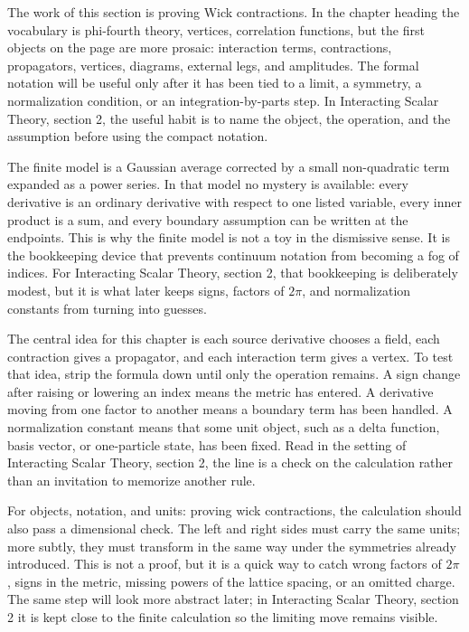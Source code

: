 The work of this section is proving Wick contractions.  In the chapter heading the vocabulary is phi-fourth theory, vertices, correlation functions, but the first objects on the page are more prosaic: interaction terms, contractions, propagators, vertices, diagrams, external legs, and amplitudes.  The formal notation will be useful only after it has been tied to a limit, a symmetry, a normalization condition, or an integration-by-parts step.  In Interacting Scalar Theory, section 2, the useful habit is to name the object, the operation, and the assumption before using the compact notation.

The finite model is a Gaussian average corrected by a small non-quadratic term expanded as a power series.  In that model no mystery is available: every derivative is an ordinary derivative with respect to one listed variable, every inner product is a sum, and every boundary assumption can be written at the endpoints.  This is why the finite model is not a toy in the dismissive sense.  It is the bookkeeping device that prevents continuum notation from becoming a fog of indices.  For Interacting Scalar Theory, section 2, that bookkeeping is deliberately modest, but it is what later keeps signs, factors of \(2\pi\), and normalization constants from turning into guesses.

The central idea for this chapter is each source derivative chooses a field, each contraction gives a propagator, and each interaction term gives a vertex.  To test that idea, strip the formula down until only the operation remains.  A sign change after raising or lowering an index means the metric has entered.  A derivative moving from one factor to another means a boundary term has been handled.  A normalization constant means that some unit object, such as a delta function, basis vector, or one-particle state, has been fixed.  Read in the setting of Interacting Scalar Theory, section 2, the line is a check on the calculation rather than an invitation to memorize another rule.

For objects, notation, and units: proving wick contractions, the calculation should also pass a dimensional check.  The left and right sides must carry the same units; more subtly, they must transform in the same way under the symmetries already introduced.  This is not a proof, but it is a quick way to catch wrong factors of \(2\pi\), signs in the metric, missing powers of the lattice spacing, or an omitted charge.  The same step will look more abstract later; in Interacting Scalar Theory, section 2 it is kept close to the finite calculation so the limiting move remains visible.

